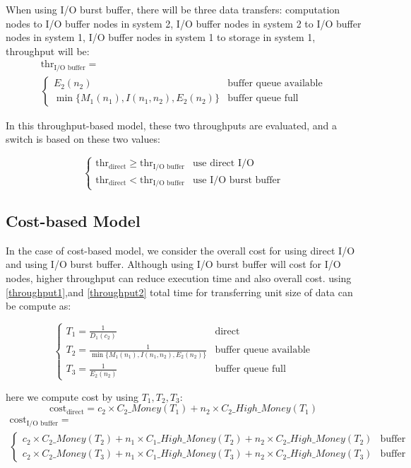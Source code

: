 When using I/O burst buffer, there will be three data transfers: computation nodes to I/O buffer nodes in system 2, I/O buffer nodes in system 2 to I/O buffer nodes in system 1, I/O buffer nodes in system 1 to storage in system 1, throughput will be:
\begin{eqnarray}
	\text{thr}_{\text{I/O buffer}}=\\\begin{cases}
		E_2(n_2) &\text{buffer queue available}\\ 
	\min\{M_1(n_1),I(n_1,n_2),E_2(n_2)\} &\text{buffer queue full}
	\end{cases} \label{throughput2}
\end{eqnarray}

In this throughput-based model, these two throughputs are evaluated, and a switch is based on these two values:

\begin{equation}
	\begin{cases}
		\text{thr}_{\text{direct}} \geq \text{thr}_{\text{I/O buffer}} & \text{use direct I/O}\\
		\text{thr}_{\text{direct}} < \text{thr}_{\text{I/O buffer}} & \text{use I/O burst buffer}
	\end{cases}
\end{equation}

\subsection{Cost-based Model}
In the case of cost-based model, we consider the overall cost for using direct I/O and using I/O burst buffer. Although using I/O burst buffer will cost for I/O nodes, higher throughput can reduce execution time and also overall cost.
using \ref{throughput1},and \ref{throughput2} total time for transferring unit size of data can be compute as:

\begin{equation}
	\begin{cases}
		T_1=\frac{1}{D_1(c_2)} & \text{direct}\\
		T_2=\frac{1}{\min\{M_1(n_1),I(n_1,n_2),E_2(n_2)\}} &\text{buffer queue available}\\
		T_3=\frac{1}{E_2(n_2)} &\text{buffer queue full}
	\end{cases}
\end{equation}

here we compute cost by using $T_1,T_2,T_3$:
\begin{equation}
	\text{cost}_\text{direct}=c_2\times C_2\_Money(T_1)+n_2\times C_2\_High\_Money(T_1)
\end{equation}
\begin{align}
	\text{cost}_\text{I/O buffer}=\\\begin{cases}
				c_2\times C_2\_Money(T_2)+n_1\times C_1\_High\_Money(T_2)+n_2\times C_2\_High\_Money(T_2)&\text{buffer queue available}\\
				c_2\times C_2\_Money(T_3)+n_1\times C_1\_High\_Money(T_3)+n_2\times C_2\_High\_Money(T_3) &\text{buffer queue full}
\end{cases}
\end{align}

